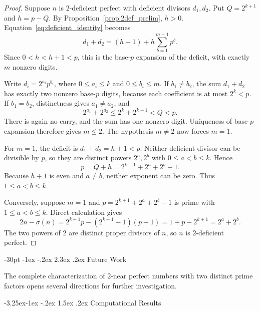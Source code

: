 \documentclass[10pt]{article}
\makeatletter
\renewcommand\section{\@startsection {section}{1}{\z@}
{-30pt \@plus -1ex \@minus -.2ex}
{2.3ex \@plus.2ex}
{\normalfont\normalsize\bfseries\boldmath}}
\renewcommand\subsection{\@startsection{subsection}{2}{\z@}
{-3.25ex\@plus -1ex \@minus -.2ex}
{1.5ex \@plus .2ex}
{\normalfont\normalsize\bfseries\boldmath}}
\theoremstyle{definition}
\makeatother
\begin{document}
\begin{proof}
Suppose $n$ is $2$-deficient perfect with deficient divisors $d_1,d_2$.
Put $Q=2^{k+1}$ and $h=p-Q$. By Proposition~\ref{prop:2def_prelim},
$h>0$. Equation~\eqref{eq:deficient_identity} becomes
\[
d_1+d_2=(h+1)+h\sum_{b=1}^{m-1}p^b.
\]
Since $0<h<h+1<p$, this is the base-$p$ expansion of the deficit,
with exactly $m$ nonzero digits.

Write $d_i=2^{a_i}p^{b_i}$, where $0\le a_i\le k$ and
$0\le b_i\le m$. If $b_1\ne b_2$, the sum $d_1+d_2$ has exactly
two nonzero base-$p$ digits, because each coefficient is at most
$2^k<p$. If $b_1=b_2$, distinctness gives $a_1\ne a_2$, and
\[
2^{a_1}+2^{a_2}\le2^k+2^{k-1}<Q<p.
\]
There is again no carry, and the sum has one nonzero digit.
Uniqueness of base-$p$ expansion therefore gives $m\le2$.
The hypothesis $m\ne2$ now forces $m=1$.

For $m=1$, the deficit is $d_1+d_2=h+1<p$. Neither deficient
divisor can be divisible by $p$, so they are distinct powers
$2^a,2^b$ with $0\le a<b\le k$. Hence
\[
p=Q+h=2^{k+1}+2^a+2^b-1.
\]
Because $h+1$ is even and $a\ne b$, neither exponent can be zero.
Thus $1\le a<b\le k$.

Conversely, suppose $m=1$ and $p=2^{k+1}+2^a+2^b-1$ is prime
with $1\le a<b\le k$. Direct calculation gives
\[
2n-\sigma(n)
=2^{k+1}p-(2^{k+1}-1)(p+1)
=1+p-2^{k+1}=2^a+2^b.
\]
The two powers of $2$ are distinct proper divisors of $n$,
so $n$ is $2$-deficient perfect.
\end{proof}

\section{Future Work}
\label{sec:future}

The complete characterization of $2$-near perfect numbers with two distinct prime factors opens several directions for further investigation.

\subsection{Computational Results}

\end{document}
